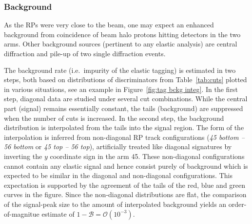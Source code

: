 \subsubsection{Background}
\label{sec:background}

As the RPs were very close to the beam, one may expect an enhanced background from coincidence of beam halo protons hitting detectors in the two arms. Other background sources (pertinent to any elastic analysis) are central diffraction and pile-up of two single diffraction events.

The background rate (i.e.~impurity of the elastic tagging) is estimated in two steps, both based on distributions of discriminators from Table~\ref{tab:cuts} plotted in various situations, see an example in Figure~\ref{fig:tag bckg integ}. In the first step, diagonal data are studied under several cut combinations. While the central part (signal) remains essentially constant, the tails (background) are suppressed when the number of cuts is increased. In the second step, the background distribution is interpolated from the tails into the signal region. The form of the interpolation is inferred from non-diagonal RP track configurations (\textit{45 bottom -- 56 bottom} or \textit{45 top -- 56 top}), artificially treated like diagonal signatures by inverting the $y$ coordinate sign in the arm 45. These non-diagonal configurations cannot contain any elastic signal and hence consist purely of background which is expected to be similar in the diagonal and non-diagonal configurations. This expectation is supported by the agreement of the tails of the red, blue and green curves in the figure. Since the non-diagonal distributions are flat, the comparison of the signal-peak size to the amount of interpolated background yields an order-of-magnitue estimate of $1 - \mathcal{B} = \mathcal{O}(10^{-3})$.

